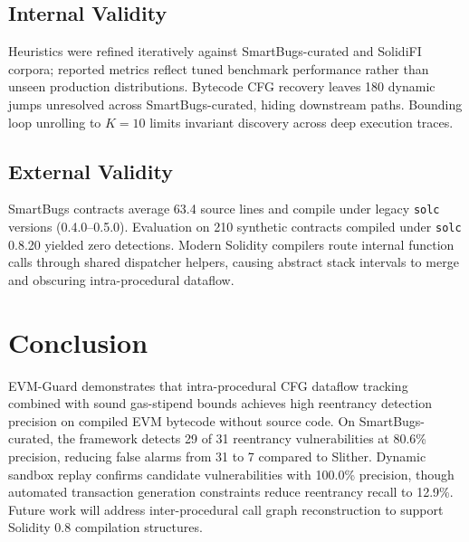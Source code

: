 \documentclass[pdflatex,sn-mathphys]{sn-jnl}
\theoremstyle{thmstyleone}
\theoremstyle{thmstyletwo}
\begin{document}
\subsection{Internal Validity}\label{sec:threats:internal}
Heuristics were refined iteratively against SmartBugs-curated and SolidiFI corpora; reported metrics reflect tuned benchmark performance rather than unseen production distributions. Bytecode CFG recovery leaves 180 dynamic jumps unresolved across SmartBugs-curated, hiding downstream paths. Bounding loop unrolling to $K = 10$ limits invariant discovery across deep execution traces.

\subsection{External Validity}\label{sec:threats:external}
SmartBugs contracts average 63.4 source lines and compile under legacy \texttt{solc} versions (0.4.0--0.5.0). Evaluation on 210 synthetic contracts compiled under \texttt{solc} 0.8.20 yielded zero detections. Modern Solidity compilers route internal function calls through shared dispatcher helpers, causing abstract stack intervals to merge and obscuring intra-procedural dataflow.

\section{Conclusion}\label{sec:conclusion}

EVM-Guard demonstrates that intra-procedural CFG dataflow tracking combined with sound gas-stipend bounds achieves high reentrancy detection precision on compiled EVM bytecode without source code. On SmartBugs-curated, the framework detects 29 of 31 reentrancy vulnerabilities at 80.6\% precision, reducing false alarms from 31 to 7 compared to Slither. Dynamic sandbox replay confirms candidate vulnerabilities with 100.0\% precision, though automated transaction generation constraints reduce reentrancy recall to 12.9\%. Future work will address inter-procedural call graph reconstruction to support Solidity 0.8 compilation structures.
\end{document}
